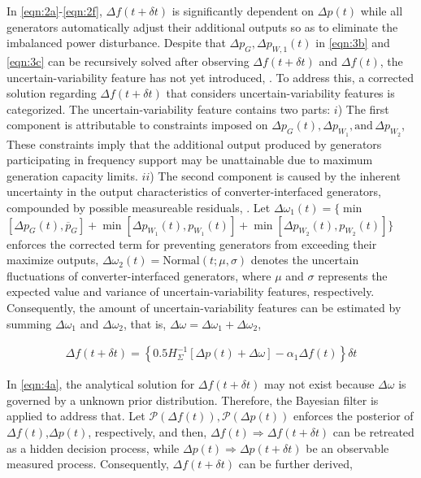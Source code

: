 \documentclass[lettersize,journal]{IEEEtran}
\newenvironment{newsubequations}{\small\begin{subequations}}{\end{subequations}}
\begin{document}
In \eqref{eqn:2a}-\eqref{eqn:2f}, \(\varDelta f(t\!+\!\delta t)\) is significantly dependent on \(\varDelta p(t)\) while all generators automatically adjust their additional outputs so as to eliminate the imbalanced power disturbance.
Despite that \( \varDelta p_{G}, \varDelta p_{W,1}(t) \) in \eqref{eqn:3b} and \eqref{eqn:3c} can be recursively solved after observing \(\varDelta f(t\!+\! \delta t)\) and \(\varDelta f(t)\), the uncertain-variability feature has not yet introduced, \cite{liu2019model}. To address this, a corrected solution regarding $\varDelta f (t\!+\!\delta t)$ that considers uncertain-variability features is categorized. The uncertain-variability feature contains two parts: $i$) The first component is attributable to constraints imposed on \(\varDelta p_{G}(t),\varDelta p_{W_1},\text{and}\, \varDelta p_{W_2}\), These constraints imply that the additional output produced by generators participating in frequency support may be unattainable due to maximum generation capacity limits. $ii$) The second component is caused by the inherent uncertainty in the output characteristics of converter-interfaced generators, compounded by possible measureable residuals, \cite{9964327,8478399,8122022}.
Let \(\varDelta \omega_{1}(t)\!=\!\!\{\min \) \([\varDelta p_{G}(t), \overline{p}_{G} ] \!+\! \min[ \varDelta p_{W_1}\!(t), {p}_{W_1}(t)] \!+\! \min [\varDelta p_{W_2}\!(t), {p}_{W_2}(t)]\}\) enforces the corrected term for preventing generators from exceeding their maximize outputs, \(\varDelta \omega_{2}(t)=\textrm{Normal}(t; \mu, \sigma)\) denotes the uncertain fluctuations of converter-interfaced generators, where \(\mu\) and \(\sigma\) represents the expected value and variance of uncertain-variability features, respectively. Consequently, the amount of uncertain-variability features can be estimated by summing \(\varDelta \omega_{1}\) and \(\varDelta \omega_{2}\), that is, \(\varDelta \omega\!=\!\varDelta \omega_{1}\!+\!\varDelta \omega_{2}\),

\vspace{-0.125in}

\begin{newsubequations}\label{eqn:4}
	\begin{align}
		\varDelta f(t\!+\!\delta t) \!=\!  \left\{ 0.5 {H_{\varSigma}^{-1}}[\varDelta p(t) \!+\! \varDelta \omega] \!-\! \alpha_1 \varDelta f(t)\right\} \delta t
		\label{eqn:4a}\end{align}
\end{newsubequations}

In \eqref{eqn:4a}, the analytical solution for $\varDelta f(t\!\!+\!\!\delta t)$ may not exist because \(\varDelta \omega\) is governed by a unknown prior distribution. Therefore, the Bayesian filter is applied to address that. Let \(\mathcal{P} (\varDelta f(t))\!,\! \mathcal{P}(\varDelta p(t))\) enforces the posterior of \(\varDelta f(t)\),\(\varDelta p(t)\), respectively, and then, \(\varDelta f(t) \!\!\Rightarrow\!\! \varDelta f(t \!+\! \delta t)\) can be retreated as a hidden decision process, while \(\varDelta p(t)\!\!\Rightarrow\!\! \varDelta p(t\!+\!\delta t)\) be an observable measured process. Consequently, \(\varDelta f(t \!+\! \delta t)\) can be further derived,
\end{document}
